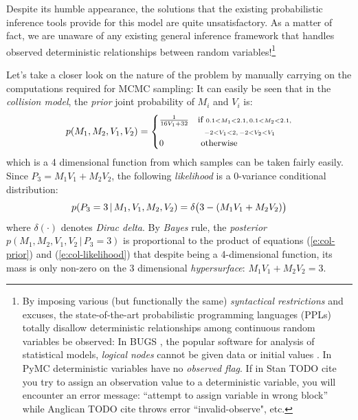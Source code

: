 \documentclass{article}
\newcommand{\otherwise}[1]{#1 &\text{ otherwise}}
\newcommand{\pr}{p}
\begin{document}
Despite its humble appearance, the solutions that the existing probabilistic inference tools provide for this model are quite unsatisfactory. 
As a matter of fact, we are unaware of any existing general inference framework that 
handles observed deterministic relationships between random variables!\footnote{
By imposing various (but functionally the same)
\emph{syntactical restrictions} and excuses, 
the state-of-the-art probabilistic programming languages (PPLs) %
totally disallow deterministic relationships among continuous random variables be observed:
In BUGS \cite{lunn2009bugs}, the popular software for analysis of statistical models, \emph{logical nodes} cannot be given data or initial values .
In PyMC \cite{patil2010pymc} deterministic variables have no \emph{observed flag}. 
If in Stan {\color{red}TODO cite} 
you try to assign an observation value to a deterministic variable, you will encounter an error message: 
``attempt to assign variable in wrong block'' while 
Anglican{\color{red} TODO cite} throws error ``invalid-observe", etc.}

Let's take a closer look on the nature of the problem by manually carrying on the computations required for MCMC sampling:
It can easily be seen that in the \emph{collision model}, 
the \emph{prior} joint probability of 
{\footnotesize $M_i$} and 
{\footnotesize $V_i$} is:
\begin{equation} \footnotesize  
\label{e:col-prior}
\pr(M_1, M_2, V_1, V_2)  
=
\begin{cases}
\frac{1}{16 V_1 + 32} &{\text{if }\scriptstyle 0.1<M_1<2.1, \, 0.1<M_2<2.1,}\\
							 &{\;\;\, \scriptstyle -2<V_1<2, \, -2<V_2 < V_1}\\
 \otherwise{0}
 \end{cases}
\end{equation}
which is a 4 dimensional function from which samples can be taken fairly easily. 
Since {\footnotesize $P_3 = M_1 V_1 + M_2 V_2$}, 
the following \emph{likelihood} is a 0-variance conditional distribution:
\begin{equation}\footnotesize
\label{e:col-likelihood}
\pr(P_3 = 3 \,|\, M_1, V_1, M_2, V_2) = \delta\big( 3 - (M_1 V_1 + M_2 V_2) \big)
\end{equation}
where $\delta(\cdot)$ denotes \emph{Dirac delta}. 
By \emph{Bayes} rule, 
the \emph{posterior} 
{\footnotesize $\pr(M_1, M_2, V_1, V_2 \,|\, P_3 = 3)$}
is proportional to the product of equations (\ref{e:col-prior}) and (\ref{e:col-likelihood}) 
that despite being a 4-dimensional function, its mass is only non-zero on the 3 dimensional \emph{hypersurface}: {\footnotesize$M_1 V_1 + M_2 V_2 = 3$}. 
\end{document}
